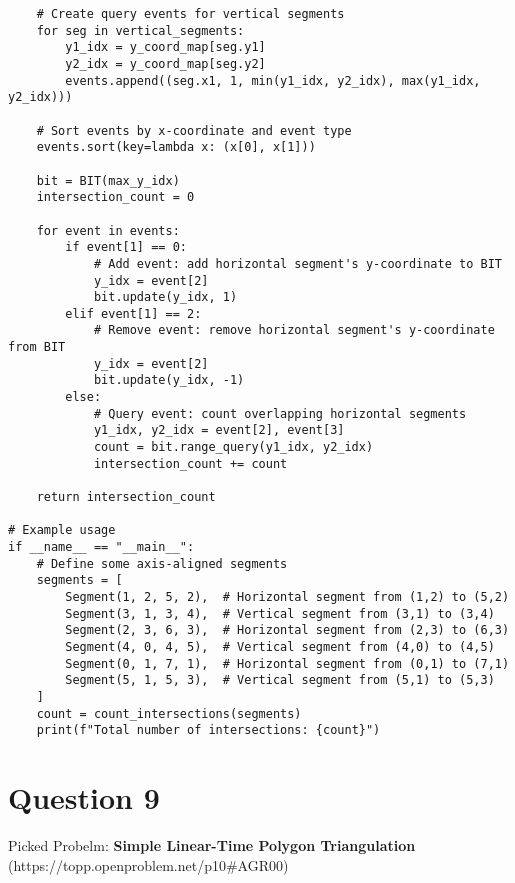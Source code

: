 \documentclass{article}
\begin{document}
\begin{verbatim}
    # Create query events for vertical segments
    for seg in vertical_segments:
        y1_idx = y_coord_map[seg.y1]
        y2_idx = y_coord_map[seg.y2]
        events.append((seg.x1, 1, min(y1_idx, y2_idx), max(y1_idx, y2_idx)))

    # Sort events by x-coordinate and event type
    events.sort(key=lambda x: (x[0], x[1]))

    bit = BIT(max_y_idx)
    intersection_count = 0

    for event in events:
        if event[1] == 0:
            # Add event: add horizontal segment's y-coordinate to BIT
            y_idx = event[2]
            bit.update(y_idx, 1)
        elif event[1] == 2:
            # Remove event: remove horizontal segment's y-coordinate from BIT
            y_idx = event[2]
            bit.update(y_idx, -1)
        else:
            # Query event: count overlapping horizontal segments
            y1_idx, y2_idx = event[2], event[3]
            count = bit.range_query(y1_idx, y2_idx)
            intersection_count += count

    return intersection_count

# Example usage
if __name__ == "__main__":
    # Define some axis-aligned segments
    segments = [
        Segment(1, 2, 5, 2),  # Horizontal segment from (1,2) to (5,2)
        Segment(3, 1, 3, 4),  # Vertical segment from (3,1) to (3,4)
        Segment(2, 3, 6, 3),  # Horizontal segment from (2,3) to (6,3)
        Segment(4, 0, 4, 5),  # Vertical segment from (4,0) to (4,5)
        Segment(0, 1, 7, 1),  # Horizontal segment from (0,1) to (7,1)
        Segment(5, 1, 5, 3),  # Vertical segment from (5,1) to (5,3)
    ]
    count = count_intersections(segments)
    print(f"Total number of intersections: {count}")
\end{verbatim}

\newpage

\section*{Question 9}
Picked Probelm: \textbf{Simple Linear-Time Polygon Triangulation} 
\\
(https://topp.openproblem.net/p10#AGR00)
\\
\end{document}
